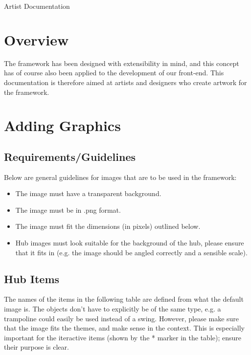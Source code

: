 \documentclass[a4paper,12pt]{article}
\begin{document}
\begin{center}
{\Huge Artist Documentation}
\end{center}

\section{Overview}
\label{sec:overview}

The framework has been designed with extensibility in mind, and this concept has of course also been applied to the development of our front-end. This documentation is therefore aimed at artists and designers who create artwork for the framework.

\section{Adding Graphics}
\label{sec:adding_graphics}

\subsection{Requirements/Guidelines}
\label{subsec:requirements_guidelines}
Below are general guidelines for images that are to be used in the framework:

\begin{itemize}
	\item The image must have a transparent background.
	\item The image must be in .png format.
	\item The image must fit the dimensions (in pixels) outlined below.
	\item Hub images must look suitable for the background of the hub, please ensure that it fits in (e.g. the image should be angled correctly and a sensible scale).
\end{itemize}

\subsection{Hub Items}
\label{subsec:hub_items}
The names of the items in the following table are defined from what the default image is. The objects don't have to explicitly be of the same type, e.g. a trampoline could easily be used instead of a swing. However, please make sure that the image fits the themes, and make sense in the context. This is especially important for the iteractive items (shown by the * marker in the table); ensure their purpose is clear.
\end{document}

